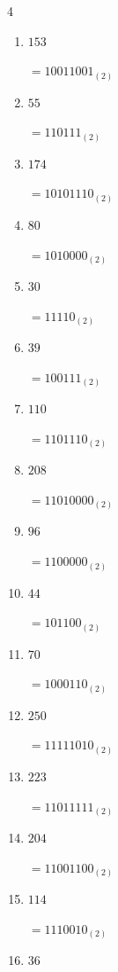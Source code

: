 \begin{multicols}{4}
\begin{enumerate}
        $=10111110_{(2)}$

  \item $153$

        $=10011001_{(2)}$

  \item $55$

        $=110111_{(2)}$

  \item $174$

        $=10101110_{(2)}$

  \item $80$

        $=1010000_{(2)}$

\columnbreak %

  \item $30$

        $=11110_{(2)}$

  \item $39$

        $=100111_{(2)}$

  \item $110$

        $=1101110_{(2)}$

  \item $208$

        $=11010000_{(2)}$

  \item $96$

        $=1100000_{(2)}$

  \item $44$

        $=101100_{(2)}$

  \item $70$

        $=1000110_{(2)}$

  \item $250$

        $=11111010_{(2)}$

  \item $223$

        $=11011111_{(2)}$

  \item $204$

        $=11001100_{(2)}$

  \item $114$

        $=1110010_{(2)}$

  \item $36$


\end{enumerate}
\end{multicols}
